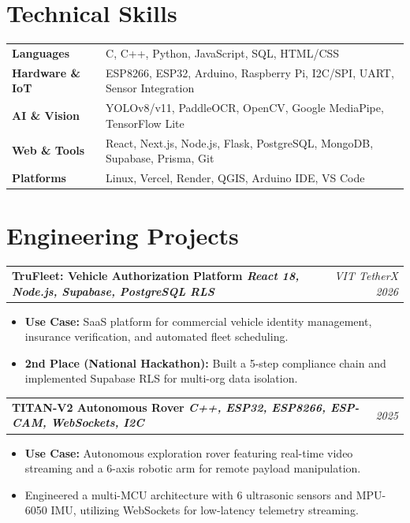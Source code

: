 \documentclass[a4paper,11pt]{article}
\makeatletter
\newcommand{\projectHeading}[2]{
  \vspace{2pt}\noindent
  \begin{tabularx}{\textwidth}{@{}X r@{}}
    \textbf{#1} & \textit{\small #2}
  \end{tabularx}
  \vspace{-3pt}
}
\makeatother
\begin{document}
\section{Technical Skills}
\begin{tabularx}{\textwidth}{@{}l X@{}}
  \textbf{Languages}        & C, C++, Python, JavaScript, SQL, HTML/CSS \\[2pt]
  \textbf{Hardware \& IoT}  & ESP8266, ESP32, Arduino, Raspberry Pi, I2C/SPI, UART, Sensor Integration \\[2pt]
  \textbf{AI \& Vision}     & YOLOv8/v11, PaddleOCR, OpenCV, Google MediaPipe, TensorFlow Lite \\[2pt]
  \textbf{Web \& Tools}     & React, Next.js, Node.js, Flask, PostgreSQL, MongoDB, Supabase, Prisma, Git \\[2pt]
  \textbf{Platforms}         & Linux, Vercel, Render, QGIS, Arduino IDE, VS Code \\
\end{tabularx}

\section{Engineering Projects}

\projectHeading
  {TruFleet: Vehicle Authorization Platform \enspace\textnormal{\small\textbar\enspace \textit{React 18, Node.js, Supabase, PostgreSQL RLS}}}
  {VIT TetherX 2026}
\begin{itemize}
  \item \textbf{Use Case:} SaaS platform for commercial vehicle identity management, insurance verification, and automated fleet scheduling.
  \item \textbf{2nd Place (National Hackathon):} Built a 5-step compliance chain and implemented Supabase RLS for multi-org data isolation. 
\end{itemize}

\projectHeading
  {TITAN-V2 Autonomous Rover \enspace\textnormal{\small\textbar\enspace \textit{C++, ESP32, ESP8266, ESP-CAM, WebSockets, I2C}}}
  {2025}
\begin{itemize}
  \item \textbf{Use Case:} Autonomous exploration rover featuring real-time video streaming and a 6-axis robotic arm for remote payload manipulation.
  \item Engineered a multi-MCU architecture with 6 ultrasonic sensors and MPU-6050 IMU, utilizing WebSockets for low-latency telemetry streaming.
\end{itemize}
\end{document}

